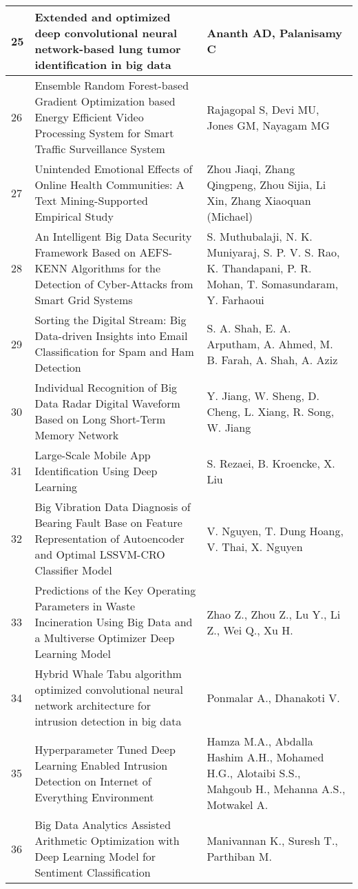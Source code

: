 \begin{landscape}
\begin{longtable}{|p{0.5cm}|p{9cm}|p{7cm}|}
    \hline
    25 & Extended and optimized deep convolutional neural network-based lung tumor identification in big data & Ananth AD, Palanisamy C \\
    \hline
    26 & Ensemble Random Forest-based Gradient Optimization based Energy Efficient Video Processing System for Smart Traffic Surveillance System & Rajagopal S, Devi MU, Jones GM, Nayagam MG \\
    \hline
    27 & Unintended Emotional Effects of Online Health Communities: A Text Mining-Supported Empirical Study & Zhou Jiaqi, Zhang Qingpeng, Zhou Sijia, Li Xin, Zhang Xiaoquan (Michael) \\
    \hline
    28 & An Intelligent Big Data Security Framework Based on AEFS-KENN Algorithms for the Detection of Cyber-Attacks from Smart Grid Systems & S. Muthubalaji, N. K. Muniyaraj, S. P. V. S. Rao, K. Thandapani, P. R. Mohan, T. Somasundaram, Y. Farhaoui \\
    \hline
    29 & Sorting the Digital Stream: Big Data-driven Insights into Email Classification for Spam and Ham Detection & S. A. Shah, E. A. Arputham, A. Ahmed, M. B. Farah, A. Shah, A. Aziz \\
    \hline
    30 & Individual Recognition of Big Data Radar Digital Waveform Based on Long Short-Term Memory Network & Y. Jiang, W. Sheng, D. Cheng, L. Xiang, R. Song, W. Jiang \\
    \hline
    31 & Large-Scale Mobile App Identification Using Deep Learning & S. Rezaei, B. Kroencke, X. Liu \\
    \hline
    32 & Big Vibration Data Diagnosis of Bearing Fault Base on Feature Representation of Autoencoder and Optimal LSSVM-CRO Classifier Model & V. Nguyen, T. Dung Hoang, V. Thai, X. Nguyen \\
    \hline
    33 & Predictions of the Key Operating Parameters in Waste Incineration Using Big Data and a Multiverse Optimizer Deep Learning Model & Zhao Z., Zhou Z., Lu Y., Li Z., Wei Q., Xu H. \\
    \hline
    34 & Hybrid Whale Tabu algorithm optimized convolutional neural network architecture for intrusion detection in big data & Ponmalar A., Dhanakoti V. \\
    \hline
    35 & Hyperparameter Tuned Deep Learning Enabled Intrusion Detection on Internet of Everything Environment & Hamza M.A., Abdalla Hashim A.H., Mohamed H.G., Alotaibi S.S., Mahgoub H., Mehanna A.S., Motwakel A. \\
    \hline
    36 & Big Data Analytics Assisted Arithmetic Optimization with Deep Learning Model for Sentiment Classification & Manivannan K., Suresh T., Parthiban M. \\

\end{longtable}
\end{landscape}
